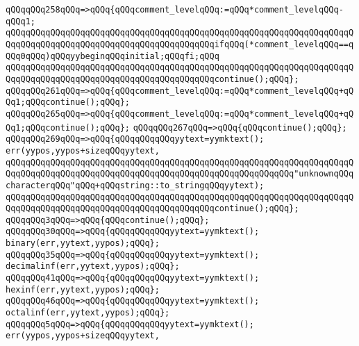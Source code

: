 \verb|qQQqqQQq258qQQq=>qQQq{qQQqcomment_levelqQQq:=qQQq*comment_levelqQQq-qQQq1;|\newline
\verb|qQQqqQQqqQQqqQQqqQQqqQQqqQQqqQQqqQQqqQQqqQQqqQQqqQQqqQQqqQQqqQQqqQQqqQQqqQQqqQQqqQQqqQQqqQQqqQQqqQQqqQQqqQQqqQQqifqQQq(*comment_levelqQQq==qQQq0qQQq)qQQqyybeginqQQqinitial;qQQqfi;qQQq|\newline
\verb|qQQqqQQqqQQqqQQqqQQqqQQqqQQqqQQqqQQqqQQqqQQqqQQqqQQqqQQqqQQqqQQqqQQqqQQqqQQqqQQqqQQqqQQqqQQqqQQqqQQqqQQqqQQqqQQqcontinue();qQQq};|\newline
\verb|qQQqqQQq261qQQq=>qQQq{qQQqcomment_levelqQQq:=qQQq*comment_levelqQQq+qQQq1;qQQqcontinue();qQQq};|\newline
\verb|qQQqqQQq265qQQq=>qQQq{qQQqcomment_levelqQQq:=qQQq*comment_levelqQQq+qQQq1;qQQqcontinue();qQQq};|\newline
\verb|qQQqqQQq267qQQq=>qQQq{qQQqcontinue();qQQq};|\newline
\verb|qQQqqQQq269qQQq=>qQQq{qQQqqQQqqQQqyytext=yymktext();|\newline
\verb|err(yypos,yypos+sizeqQQqyytext,|\newline
\verb|qQQqqQQqqQQqqQQqqQQqqQQqqQQqqQQqqQQqqQQqqQQqqQQqqQQqqQQqqQQqqQQqqQQqqQQqqQQqqQQqqQQqqQQqqQQqqQQqqQQqqQQqqQQqqQQqqQQqqQQqqQQqqQQq"unknownqQQqcharacterqQQq"qQQq+qQQqstring::to_stringqQQqyytext);|\newline
\verb|qQQqqQQqqQQqqQQqqQQqqQQqqQQqqQQqqQQqqQQqqQQqqQQqqQQqqQQqqQQqqQQqqQQqqQQqqQQqqQQqqQQqqQQqqQQqqQQqqQQqqQQqqQQqqQQqcontinue();qQQq};|\newline
\verb|qQQqqQQq3qQQq=>qQQq{qQQqcontinue();qQQq};|\newline
\verb|qQQqqQQq30qQQq=>qQQq{qQQqqQQqqQQqyytext=yymktext();|\newline
\verb|binary(err,yytext,yypos);qQQq};|\newline
\verb|qQQqqQQq35qQQq=>qQQq{qQQqqQQqqQQqyytext=yymktext();|\newline
\verb|decimalinf(err,yytext,yypos);qQQq};|\newline
\verb|qQQqqQQq41qQQq=>qQQq{qQQqqQQqqQQqyytext=yymktext();|\newline
\verb|hexinf(err,yytext,yypos);qQQq};|\newline
\verb|qQQqqQQq46qQQq=>qQQq{qQQqqQQqqQQqyytext=yymktext();|\newline
\verb|octalinf(err,yytext,yypos);qQQq};|\newline
\verb|qQQqqQQq5qQQq=>qQQq{qQQqqQQqqQQqyytext=yymktext();|\newline
\verb|err(yypos,yypos+sizeqQQqyytext,|\newline
